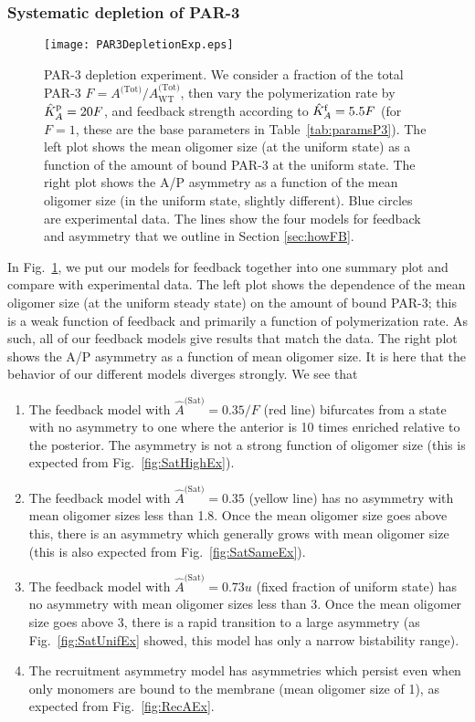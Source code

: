 \documentclass[11pt]{article}
\newcommand{\red}[1]{\color{red}#1\normalcolor}
\newcommand{\6}[1]{#1_{\text{6}}}
\newcommand{\3}[1]{#1_{\text{3}}}
\newcommand{\Tot}[1]{#1^\text{(Tot)}}
\newcommand{\Sat}[1]{#1^\text{(Sat)}}
\begin{document}
\subsubsection{Systematic depletion of PAR-3}

\begin{figure}
\centering
\texttt{[image: PAR3DepletionExp.eps]}
\caption{\label{fig:P3Depl}PAR-3 depletion experiment. We consider a fraction of the total PAR-3 $F=\Tot{A}/\Tot{A}_\text{WT}$, then vary the polymerization rate by $\hat{K}^\text{p}_A=20F$, and feedback strength according to $\hat{K}^\text{f}_A=5.5F$ (for $F=1$, these are the base parameters in Table\ \ref{tab:paramsP3}). The left plot shows the mean oligomer size (at the uniform state) as a function of the amount of bound PAR-3 at the uniform state. The right plot shows the A/P asymmetry as a function of the mean oligomer size \red{(in the uniform state, slightly different)}. Blue circles are experimental data. The lines show the four models for feedback and asymmetry that we outline in Section \ref{sec:howFB}.}
\end{figure}

In Fig.\ \ref{fig:P3Depl}, we put our models for feedback together into one summary plot and compare with experimental data. The left plot shows the dependence of the mean oligomer size (at the uniform steady state) on the amount of bound PAR-3; this is a weak function of feedback and primarily a function of polymerization rate. As such, all of our feedback models give results that match the data. The right plot shows the A/P asymmetry as a function of mean oligomer size. It is here that the behavior of our different models diverges strongly. We see that 
\begin{enumerate}
\item The feedback model with $\Sat{\hat A}=0.35/F$ (red line) bifurcates from a state with no asymmetry to one where the anterior is 10 times enriched relative to the posterior. The asymmetry is not a strong function of oligomer size (this is expected from Fig.\ \ref{fig:SatHighEx}).
\item The feedback model with $\Sat{\hat A}=0.35$ (yellow line) has no asymmetry with mean oligomer sizes less than 1.8. Once the mean oligomer size goes above this, there is an asymmetry which generally grows with mean oligomer size  (this is also expected from Fig.\ \ref{fig:SatSameEx}).
\item The feedback model with $\Sat{\hat A}=0.73u$ (fixed fraction of uniform state) has no asymmetry with mean oligomer sizes less than 3. Once the mean oligomer size goes above 3, there is a rapid transition to a large asymmetry (as Fig.\ \ref{fig:SatUnifEx} showed, this model has only a narrow bistability range). 
\item The recruitment asymmetry model has asymmetries which persist even when only monomers are bound to the membrane (mean oligomer size of 1), as expected from Fig.\ \ref{fig:RecAEx}.
\end{enumerate}
\end{document}

